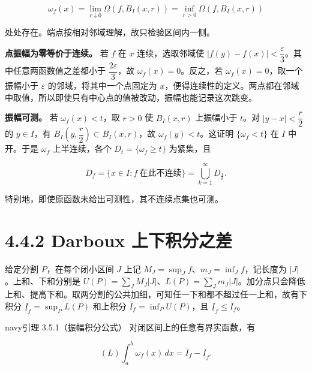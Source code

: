 \documentclass[11pt,a4paper]{article}
\begin{document}
\begin{equation*}
\omega_f(x)=\lim_{r\downarrow0}\Omega(f,B_I(x,r))
=\inf_{r>0}\Omega(f,B_I(x,r))
\tag{4.4.1}
\end{equation*}

处处存在。端点按相对邻域理解，故只检验区间内一侧。

\textbf{点振幅为零等价于连续。} 若 \(f\) 在 \(x\) 连续，选取邻域使
\(|f(y)-f(x)|<\dfrac{\varepsilon}{3}\)。其中任意两函数值之差都小于
\(\dfrac{2\varepsilon}{3}\)，故 \(\omega_f(x)=0\)。反之，若
\(\omega_f(x)=0\)，取一个振幅小于 \(\varepsilon\)
的邻域，将其中一个点固定为
\(x\)，便得连续性的定义。两点都在邻域中取值，所以即使只有中心点的值被改动，振幅也能记录这次跳变。

\textbf{振幅可测。} 若 \(\omega_f(x)<t\)，取 \(r>0\) 使 \(B_I(x,r)\)
上振幅小于 \(t\)。对 \(|y-x|<\dfrac r2\) 的 \(y\in I\)，有
\(B_I(y,\dfrac r2)\subset B_I(x,r)\)，故 \(\omega_f(y)<t\)。这证明
\(\{\omega_f<t\}\) 在 \(I\) 中开。于是 \(\omega_f\) 上半连续，各个
\(D_t=\{\omega_f\ge t\}\) 为紧集，且

\begin{equation*}
D_f=\{x\in I:f\ \text{在此不连续}\}
=\bigcup_{k=1}^{\infty}D_{\frac1k}.
\tag{4.4.2}
\end{equation*}

特别地，即使原函数未给出可测性，其不连续点集也可测。

\section[\S{}4.4.2 Darboux
上下积分之差]{4.4.2 Darboux
上下积分之差}\label{darboux-ux4e0aux4e0bux79efux5206ux4e4bux5dee}

给定分割 \(P\)，在每个闭小区间 \(J\) 上记
\(M_J=\sup_J f\)、\(m_J=\inf_J f\)，记长度为 \(|J|\)。上和、下和分别是
\(U(P)=\sum_J M_J|J|\)、\(L(P)=\sum_J m_J|J|\)。加分点只会降低上和、提高下和。取两分割的公共加细，可知任一下和都不超过任一上和，故有下积分
\(\underline I_f=\sup_P L(P)\) 和上积分
\(\overline I_f=\inf_P U(P)\)，且 \(\underline I_f\le\overline I_f\)。

\begin{sboxenv}{navy}{引理 3.5.1（振幅积分公式）}
对闭区间上的任意有界实函数，有

\begin{equation*}
(L)\int_a^b\omega_f(x)\,dx=\overline I_f-\underline I_f.
\tag{4.4.3}
\end{equation*}

\end{sboxenv}
\end{document}
